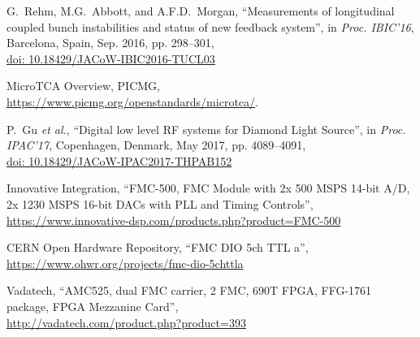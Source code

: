 \documentclass[
    a4paper,
    keeplastbox,            %
    hyphens,                %
]{jacow}
\begin{document}
\begin{thebibliography}{99}
G.~Rehm, M.G.~Abbott, and A.F.D.~Morgan, \enquote{Measurements of longitudinal
coupled bunch instabilities and status of new feedback system}, 
in \emph{Proc. IBIC'16}, Barcelona, Spain, Sep. 2016, pp. 298--301, \\
\url{doi: 10.18429/JACoW-IBIC2016-TUCL03}

MicroTCA Overview, PICMG, \\
\url{https://www.picmg.org/openstandards/microtca/}.

P.~Gu \emph{et al.}, \enquote{Digital low level RF systems for Diamond Light Source},
in \emph{Proc. IPAC'17}, Copenhagen, Denmark, May 2017, pp. 4089--4091,\\
\url{doi: 10.18429/JACoW-IPAC2017-THPAB152}


Innovative Integration, \enquote{FMC-500, FMC Module with 2x 500 MSPS 14-bit
A/D, 2x 1230 MSPS 16-bit DACs with PLL and Timing Controls},
\url{https://www.innovative-dsp.com/products.php?product=FMC-500}

CERN Open Hardware Repository, \enquote{FMC DIO 5ch TTL a},
\url{https://www.ohwr.org/projects/fmc-dio-5chttla}

Vadatech, \enquote{AMC525, dual FMC carrier, 2 FMC, 690T FPGA, FFG-1761 package,
FPGA Mezzanine Card}, \\
\url{http://vadatech.com/product.php?product=393}


\end{thebibliography}
\end{document}
